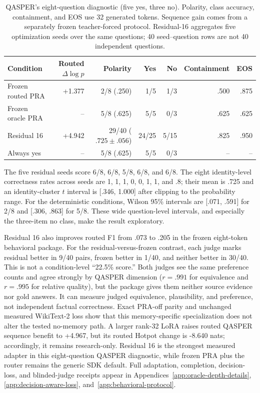\documentclass[11pt]{article}
\begin{document}
\begin{table}[H]
\centering
\scriptsize
\caption{QASPER's eight-question diagnostic (five yes, three no). Polarity, class accuracy,
containment, and EOS use 32 generated tokens. Sequence gain comes from a separately frozen
teacher-forced protocol. Residual-16 aggregates five optimization seeds over the same questions;
40 seed--question rows are not 40 independent questions.}
\label{tab:qasper-main}
\begin{tabular}{lrrrrrr}
\toprule
Condition & Routed $\Delta\log p$ & Polarity & Yes & No & Containment & EOS \\
\midrule
Frozen routed PRA & +1.377 & 2/8 (.250) & 1/5 & 1/3 & .500 & .875 \\
Frozen oracle PRA & -- & 5/8 (.625) & 5/5 & 0/3 & .625 & .625 \\
Residual 16 & +4.942 & 29/40 ($.725\pm.056$) & 24/25 & 5/15 & .825 & .950 \\
Always yes & -- & 5/8 (.625) & 5/5 & 0/3 & -- & -- \\
\bottomrule
\end{tabular}
\end{table}

The five residual seeds score 6/8, 6/8, 5/8, 6/8, and 6/8. The eight identity-level correctness
rates across seeds are 1, 1, 1, 0, 0, 1, 1, and .8; their mean is .725 and an identity-cluster
$t$ interval is [.346, 1.000] after clipping to the probability range. For the deterministic
conditions, Wilson 95\% intervals are [.071, .591] for 2/8 and [.306, .863] for 5/8. These wide
question-level intervals, and especially the three-item no class, make the result exploratory.

Residual 16 also improves routed F1 from .073 to .205 in the frozen eight-token behavioral
package. For the residual-versus-frozen contrast, each judge marks residual better in 9/40 pairs,
frozen better in 1/40, and neither better in 30/40. This is not a condition-level ``22.5\% score.''
Both judges see the same preference counts and agree strongly by QASPER dimension ($r=.991$ for
equivalence and $r=.995$ for relative quality), but the package gives them neither source evidence
nor gold answers. It can measure judged equivalence, plausibility, and preference, not independent
factual correctness. Exact PRA-off parity and unchanged measured WikiText-2 loss show that this
memory-specific specialization does not alter the tested no-memory path.  A larger rank-32 LoRA
raises routed QASPER sequence benefit to +4.967, but its routed Hotpot change is -8.640 nats;
accordingly, it remains research-only. Residual 16 is the strongest measured adapter in this
eight-question QASPER diagnostic,
while frozen PRA plus the router remains the generic SDK default.  Full adaptation, completion,
decision-loss, and blinded-judge receipts appear in Appendices~\ref{app:oracle-depth-details},
\ref{app:decision-aware-loss}, and~\ref{app:behavioral-protocol}.
\end{document}
